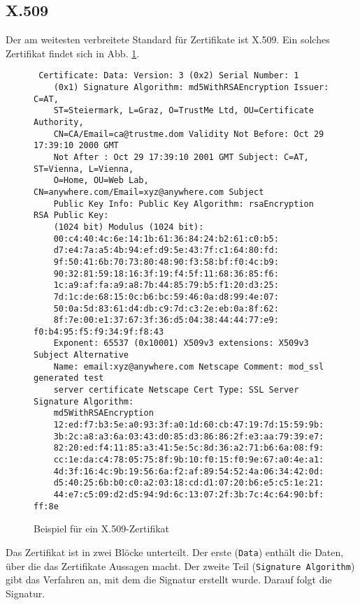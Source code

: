 \subsection{X.509}\indexXFiveZeroNine Der am weitesten verbreitete
Standard für Zertifikate ist X.509. Ein solches Zertifikat findet sich
in Abb. \ref{fig:x509}.
\begin{figure}
  \begin{lstlisting} Certificate: Data: Version: 3 (0x2) Serial Number: 1
    (0x1) Signature Algorithm: md5WithRSAEncryption Issuer: C=AT,
    ST=Steiermark, L=Graz, O=TrustMe Ltd, OU=Certificate Authority,
    CN=CA/Email=ca@trustme.dom Validity Not Before: Oct 29 17:39:10 2000 GMT
    Not After : Oct 29 17:39:10 2001 GMT Subject: C=AT, ST=Vienna, L=Vienna,
    O=Home, OU=Web Lab, CN=anywhere.com/Email=xyz@anywhere.com Subject
    Public Key Info: Public Key Algorithm: rsaEncryption RSA Public Key:
    (1024 bit) Modulus (1024 bit):
    00:c4:40:4c:6e:14:1b:61:36:84:24:b2:61:c0:b5:
    d7:e4:7a:a5:4b:94:ef:d9:5e:43:7f:c1:64:80:fd:
    9f:50:41:6b:70:73:80:48:90:f3:58:bf:f0:4c:b9:
    90:32:81:59:18:16:3f:19:f4:5f:11:68:36:85:f6:
    1c:a9:af:fa:a9:a8:7b:44:85:79:b5:f1:20:d3:25:
    7d:1c:de:68:15:0c:b6:bc:59:46:0a:d8:99:4e:07:
    50:0a:5d:83:61:d4:db:c9:7d:c3:2e:eb:0a:8f:62:
    8f:7e:00:e1:37:67:3f:36:d5:04:38:44:44:77:e9: f0:b4:95:f5:f9:34:9f:f8:43
    Exponent: 65537 (0x10001) X509v3 extensions: X509v3 Subject Alternative
    Name: email:xyz@anywhere.com Netscape Comment: mod_ssl generated test
    server certificate Netscape Cert Type: SSL Server Signature Algorithm:
    md5WithRSAEncryption
    12:ed:f7:b3:5e:a0:93:3f:a0:1d:60:cb:47:19:7d:15:59:9b:
    3b:2c:a8:a3:6a:03:43:d0:85:d3:86:86:2f:e3:aa:79:39:e7:
    82:20:ed:f4:11:85:a3:41:5e:5c:8d:36:a2:71:b6:6a:08:f9:
    cc:1e:da:c4:78:05:75:8f:9b:10:f0:15:f0:9e:67:a0:4e:a1:
    4d:3f:16:4c:9b:19:56:6a:f2:af:89:54:52:4a:06:34:42:0d:
    d5:40:25:6b:b0:c0:a2:03:18:cd:d1:07:20:b6:e5:c5:1e:21:
    44:e7:c5:09:d2:d5:94:9d:6c:13:07:2f:3b:7c:4c:64:90:bf: ff:8e
  \end{lstlisting}
  \caption{Beispiel für ein X.509-Zertifikat}
  \label{fig:x509}
\end{figure}

Das Zertifikat ist in zwei Blöcke unterteilt. Der erste (\texttt{Data})
enthält die Daten, über die das Zertifikate Aussagen macht. Der zweite
Teil (\texttt{Signature Algorithm}) gibt das Verfahren an, mit dem die
Signatur erstellt wurde. Darauf folgt die Signatur.

